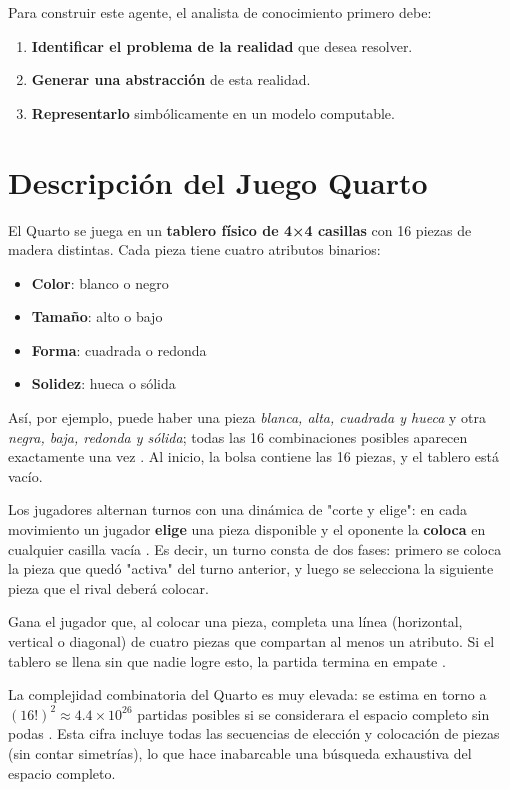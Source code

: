 \documentclass[conference]{IEEEtran}
\begin{document}
Para construir este agente, el analista de conocimiento primero debe:
\begin{enumerate}
\item \textbf{Identificar el problema de la realidad} que desea resolver.
\item \textbf{Generar una abstracción} de esta realidad.
\item \textbf{Representarlo} simbólicamente en un modelo computable.
\end{enumerate}

\section{Descripción del Juego Quarto}

El Quarto se juega en un \textbf{tablero físico de 4×4 casillas} con 16 piezas de madera distintas. Cada pieza tiene cuatro atributos binarios:
\begin{itemize}
\item \textbf{Color}: blanco o negro
\item \textbf{Tamaño}: alto o bajo
\item \textbf{Forma}: cuadrada o redonda
\item \textbf{Solidez}: hueca o sólida
\end{itemize}

Así, por ejemplo, puede haber una pieza \textit{blanca, alta, cuadrada y hueca} y otra \textit{negra, baja, redonda y sólida}; todas las 16 combinaciones posibles aparecen exactamente una vez \cite{muller2009}. Al inicio, la bolsa contiene las 16 piezas, y el tablero está vacío.

Los jugadores alternan turnos con una dinámica de "corte y elige": en cada movimiento un jugador \textbf{elige} una pieza disponible y el oponente la \textbf{coloca} en cualquier casilla vacía \cite{santana2012}. Es decir, un turno consta de dos fases: primero se coloca la pieza que quedó "activa" del turno anterior, y luego se selecciona la siguiente pieza que el rival deberá colocar.

Gana el jugador que, al colocar una pieza, completa una línea (horizontal, vertical o diagonal) de cuatro piezas que compartan al menos un atributo. Si el tablero se llena sin que nadie logre esto, la partida termina en empate \cite{muller2009}.

La complejidad combinatoria del Quarto es muy elevada: se estima en torno a $(16!)^2 \approx 4.4 \times 10^{26}$ partidas posibles si se considerara el espacio completo sin podas \cite{santana2012}. Esta cifra incluye todas las secuencias de elección y colocación de piezas (sin contar simetrías), lo que hace inabarcable una búsqueda exhaustiva del espacio completo.
\end{document}
